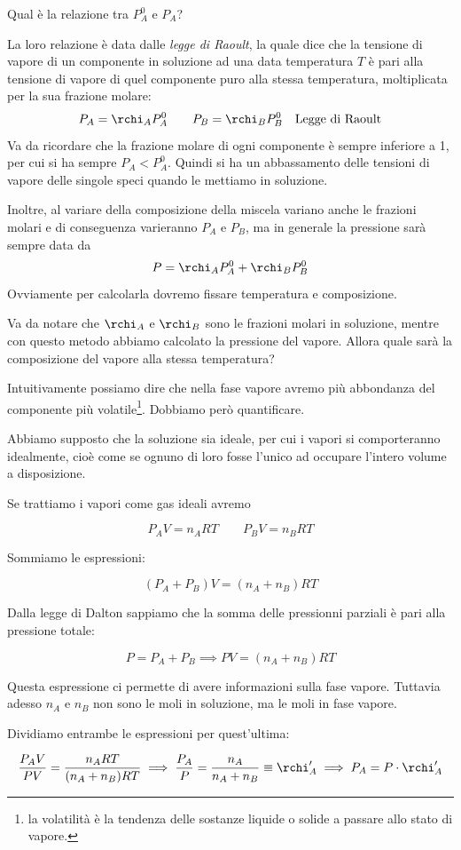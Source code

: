 Qual è la relazione tra $P^0_A$ e $P_A$?

La loro relazione è data dalle \textit{legge di Raoult}, la quale dice che la tensione di vapore di un componente in soluzione ad una data temperatura $T$ è pari alla tensione di vapore di quel componente puro alla stessa temperatura, moltiplicata per la sua frazione molare:
$$P_A=\rchi_A P^0_A \qquad P_B=\rchi_B P^0_B \quad \text{Legge di Raoult}$$
Va da ricordare che la frazione molare di ogni componente è sempre inferiore a 1, per cui si ha sempre $P_A < P^0_A$. Quindi si ha un abbassamento delle tensioni di vapore delle singole speci quando le mettiamo in soluzione.

Inoltre, al variare della composizione della miscela variano anche le frazioni molari e di conseguenza varieranno $P_A$ e $P_B$, ma in generale la pressione sarà sempre data da
$$P=\rchi_A P^0_A + \rchi_B P^0_B$$
Ovviamente per calcolarla dovremo fissare temperatura e composizione.

Va da notare che $\rchi_A$ e $\rchi_B$ sono le frazioni molari in soluzione, mentre con questo metodo abbiamo calcolato la pressione del vapore. Allora quale sarà la composizione del vapore alla stessa temperatura?

Intuitivamente possiamo dire che nella fase vapore avremo più abbondanza del componente più volatile\footnote{la volatilità è la tendenza delle sostanze liquide o solide a passare allo stato di vapore.}. Dobbiamo però quantificare.

Abbiamo supposto che la soluzione sia ideale, per cui i vapori si comporteranno idealmente, cioè come se ognuno di loro fosse l'unico ad occupare l'intero volume a disposizione.

Se trattiamo i vapori come gas ideali avremo

$$P_AV=n_ART
\qquad
P_BV=n_BRT$$

Sommiamo le espressioni:

$$(P_A + P_B)V= (n_A + n_B)RT$$

Dalla legge di Dalton sappiamo che la somma delle pressionni parziali è pari alla pressione totale:

$$P=P_A + P_B \implies PV=(n_A + n_B)RT$$

Questa espressione ci permette di avere informazioni sulla fase vapore. Tuttavia adesso $n_A$ e $n_B$ non sono le moli in soluzione, ma le moli in fase vapore.

Dividiamo entrambe le espressioni per quest'ultima:

$$\frac{P_AV}{PV}= \frac{n_ART}{(n_A + n_B)RT}
\implies
\frac{P_A}{P} = \frac{n_A}{n_A + n_B}\equiv \rchi '_A
\implies
P_A=P \cdot \rchi '_A$$

